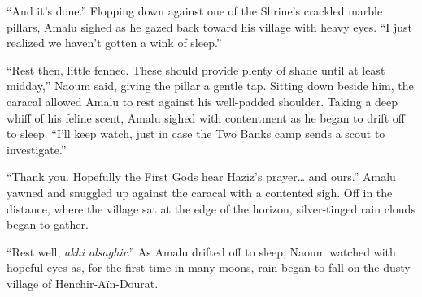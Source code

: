 ``And it's done.'' Flopping down against one of the Shrine's crackled marble pillars, Amalu sighed as he gazed back toward his village with heavy eyes. ``I just realized we haven't gotten a wink of sleep.''

``Rest then, little fennec. These should provide plenty of shade until at least midday,'' Naoum said, giving the pillar a gentle tap. Sitting down beside him, the caracal allowed Amalu to rest against his well-padded shoulder. Taking a deep whiff of his feline scent, Amalu sighed with contentment as he began to drift off to sleep. ``I'll keep watch, just in case the Two Banks camp sends a scout to investigate.''

``Thank you. Hopefully the First Gods hear Haziz's prayer\ldots{} and ours.'' Amalu yawned and snuggled up against the caracal with a contented sigh. Off in the distance, where the village sat at the edge of the horizon, silver-tinged rain clouds began to gather.

``Rest well, \emph{akhi alsaghir}.'' As Amalu drifted off to sleep, Naoum watched with hopeful eyes as, for the first time in many moons, rain began to fall on the dusty village of Henchir-Aïn-Dourat.
